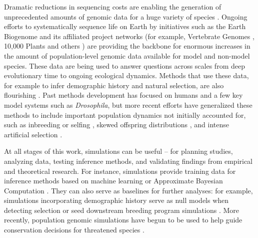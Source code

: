 \documentclass[hidelinks]{article}
\begin{document}

Dramatic reductions in sequencing costs are enabling the generation of
unprecedented amounts of genomic data for a huge variety of species
\citep{Ellegren2014}. Ongoing efforts to systematically sequence life on
Earth by initiatives such as the Earth Biogenome \citep{Lewin2022} and its
affiliated project networks (for example, Vertebrate Genomes
\citep{Rhie2021}, 10,000 Plants \citep{Cheng2018} and others \citep{darwin2022sequence}) are
providing the backbone for enormous increases in the amount of population-level genomic data
available for model and non-model species.
These data are being used to answer questions across scales
from deep evolutionary time to ongoing ecological dynamics.
Methods that use these data, for example to infer demographic history and natural selection,
are also flourishing \citep{Beichman2018}.
Past methods development has focused on humans and a few key model systems such as \emph{Drosophila},
but more recent efforts have
generalized these methods to include important population dynamics not initially accounted for,
such as inbreeding or selfing \citep{Blischak2020}, skewed offspring
distributions \citep{Montano2016}, and intense artificial selection \citep{MacLeod2013, MacLeod2014}.

At all stages of this work, simulations can be useful --
for planning studies, analyzing data, testing inference methods,
and validating findings from empirical and theoretical research.
For instance, simulations provide training data
for inference methods based on machine learning \citep{Schrider2018} or
Approximate Bayesian Computation \citep{Csillery2010}. They can also serve as
baselines for further analyses: for example, simulations incorporating
demographic history serve as null models when detecting selection \citep{Hsieh2016a}
or seed downstream breeding program simulations \citep{Gaynor2020}.
More recently, population genomic simulations have begun
to be used to help guide conservation decisions for threatened species
\citep{Teixeira2021,kyriazis2022using}.
\end{document}
